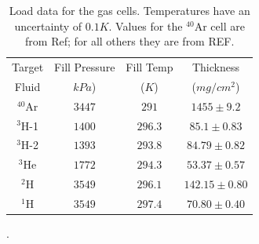 \documentclass[final,5p,times,twocolumn]{elsarticle}
\begin{document}
\begin{table}[!h]
\centering
\begin{adjustbox}{width=0.5\textwidth}
\begin{tabular}{|c|c|c|c|}
	\hline 
	Target       & Fill Pressure & Fill Temp    & Thickness \\
	Fluid  		 &	$kPa$)		 &	($K$) 	    & ($mg/cm^2$) \\
	\hline 
	$^{40}$Ar	 & $3447$ 		 & $291$	    &  $1455\pm9.2$ \\ 
	\hline 
	$^{3}$H-1 	 & $1400$		 & $296.3$	    &  $85.1\pm 0.83$ \\ 
	\hline 
	$^{3}$H-2	 & $1393$		 & $293.8$		&  $84.79\pm0.82$ \\
	\hline
	$^{3}$He	 & $1772$		 & $294.3$	    &  $53.37\pm0.57$ \\ 
	\hline 
	$^{2}$H 	 & $3549$		 & $296.1$	    &  $142.15\pm0.80$ \\ 
	\hline 
	$^{1}$H 	 & $3549$		 & $297.4$	    &  $70.80\pm0.40$ \\ 
	\hline 
\end{tabular}
\end{adjustbox}
\caption{Load data for the gas cells. Temperatures have an uncertainty of $0.1K$. Values for the $^{40}$Ar cell are from  Ref\cite{ar_config}; for all others they are from REF\cite{cellconfig}. }.
\label{tab:fill_tar}
\end{table}
\end{document}
